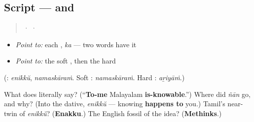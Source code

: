 \subsection*{Script —  and }
\begin{quote}
  ·    ·  
\end{quote}

\begin{itemize}
\raggedright
  \item \emph{Point to:} each , \emph{ka} — two words have it
  \item \emph{Point to:} the soft , then the hard 
\end{itemize}

(\textbf{}: \emph{enikkŭ}, \emph{namaskāraṁ}. Soft \textbf{}: \emph{namaskāraṁ}. Hard \textbf{}: \emph{aṟiyāṁ}.)

\begin{tcolorbox}[breakable,colback=teal!4,colframe=teal!35!black,title={Before you move on}]
What does \textbf{  } literally say? (\textquotedblleft{}\textbf{To-me} Malayalam \textbf{is-knowable}.\textquotedblright{}) Where did \emph{ñān} go, and why? (Into the dative, \emph{enikkŭ} — knowing \textbf{happens to} you.) Tamil's near-twin of \emph{enikkŭ}? (\textbf{Enakku}.) The English fossil of the idea? (\textbf{Methinks}.)
\end{tcolorbox}
